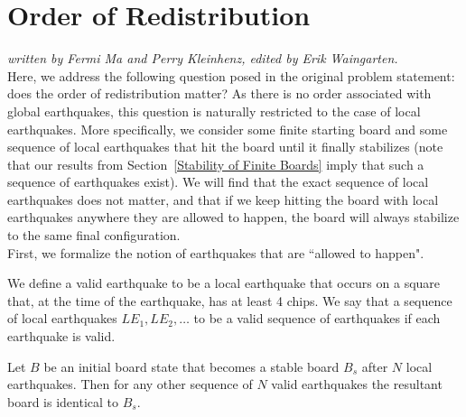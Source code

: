 \documentclass[runningheads,a4paper]{llncs}
\begin{document}
\section{Order of Redistribution}
\label{Order of Redistribution}

\emph{written by Fermi Ma and Perry Kleinhenz, edited by Erik Waingarten.}\\

Here, we address the following question posed in the original problem statement: does the order of redistribution matter? As there is no order associated with global earthquakes, this question is naturally restricted to the case of local earthquakes. More specifically, we consider some finite starting board and some sequence of local earthquakes that hit the board until it finally stabilizes (note that our results from Section~\ref{Stability of Finite Boards} imply that such a sequence of earthquakes exist). We will find that the exact sequence of local earthquakes does not matter, and that if we keep hitting the board with local earthquakes anywhere they are allowed to happen, the board will always stabilize to the same final configuration.\\

First, we formalize the notion of earthquakes that are ``allowed to happen".

\begin{definition}
We define a valid earthquake to be a local earthquake that occurs on a square that, at the time of the earthquake, has at least 4 chips. We say that a sequence of local earthquakes $LE_1, LE_2, \ldots$ to be a valid sequence of earthquakes if each earthquake is valid.
\end{definition}

\begin{theorem}
Let $B$ be an initial board state that becomes a stable board $B_s$ after $N$ local earthquakes. Then for any other sequence of $N$ valid earthquakes the resultant board is identical to $B_s$.
\end{theorem}
\end{document}
